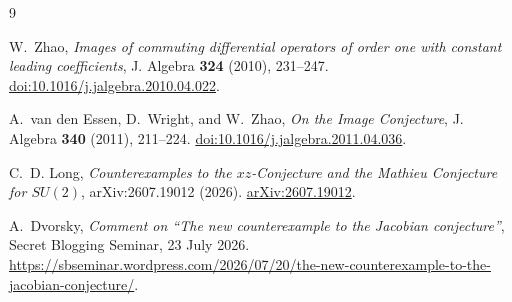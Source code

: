 \documentclass[11pt]{article}
\begin{document}
\begin{thebibliography}{9}
\small

W.~Zhao,
\emph{Images of commuting differential operators of order one with
constant leading coefficients},
J. Algebra \textbf{324} (2010), 231--247.
\href{https://doi.org/10.1016/j.jalgebra.2010.04.022}
{doi:10.1016/j.jalgebra.2010.04.022}.

A.~van den Essen, D.~Wright, and W.~Zhao,
\emph{On the Image Conjecture},
J. Algebra \textbf{340} (2011), 211--224.
\href{https://doi.org/10.1016/j.jalgebra.2011.04.036}
{doi:10.1016/j.jalgebra.2011.04.036}.

C.~D. Long,
\emph{Counterexamples to the \(xz\)-Conjecture and the Mathieu
Conjecture for \(SU(2)\)},
arXiv:2607.19012 (2026).
\href{https://arxiv.org/abs/2607.19012}{arXiv:2607.19012}.

A.~Dvorsky,
\emph{Comment on ``The new counterexample to the Jacobian conjecture''},
Secret Blogging Seminar, 23 July 2026.
\url{https://sbseminar.wordpress.com/2026/07/20/the-new-counterexample-to-the-jacobian-conjecture/}.

\end{thebibliography}
\end{document}
